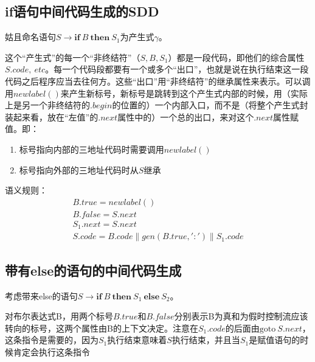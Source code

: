 \documentclass[]{report}
\begin{document}
		\subsection{if语句中间代码生成的SDD}
			姑且命名语句$S\to\mathbf{if}\ B\ \mathbf{then}\ S_1$为产生式$\gamma$。\par
			这个“产生式”的每一个“非终结符”（$S,B,S_1$）都是一段代码，即他们的综合属性$S.code,\ etc$。每一个代码段都要有一个或多个“出口”，也就是说在执行结束这一段代码之后程序应当去往何方。这些“出口”用“非终结符”的继承属性来表示。可以调用$newlabel()$来产生新标号，新标号是跳转到这个产生式内部的时候，用（实际上是另一个非终结符的$.begin$的位置的）一个内部入口，而不是（将整个产生式封装起来看，放在“左值”的$.next$属性中的）一个总的出口，来对这个$.next$属性赋值。即：
			\begin{enumerate}
				\item 标号指向内部的三地址代码时需要调用$newlabel()$
				\item 标号指向外部的三地址代码时从$S$继承
			\end{enumerate}\par
			语义规则：
			\[\begin{gathered}
				B.true=newlabel()\\
				B.false=S.next\\
				S_1.next=S.next\\
				S.code=B.code\parallel gen(B.true,':')\parallel S_1.code
			\end{gathered}\]
		\subsection{带有else的语句的中间代码生成}
			考虑带来else的语句$S\to\mathbf{if}\ B\ \mathbf{then}\ S_1\ \mathbf{else}\ S_2$。\par
			对布尔表达式B，用两个标号$B.true$和$B.false$分别表示B为真和为假时控制流应该转向的标号，这两个属性由B的上下文决定。注意在$S_1.code$的后面由$\mathrm{goto}\ S.next$，这条指令是需要的，因为$S_1$执行结束意味着$S$执行结束，并且当$S_1$是赋值语句的时候肯定会执行这条指令
\end{document}
